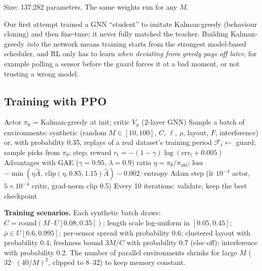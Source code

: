 Size: 137{,}282 parameters. The same weights run for any $M$.

\begin{whybox}
Our first attempt trained a GNN ``student'' to imitate Kalman-greedy (behaviour cloning) and then fine-tune; it never
fully matched the teacher. Building Kalman-greedy \emph{into} the network means training starts from the strongest
model-based scheduler, and RL only has to learn \emph{when deviating from greedy pays off later}, for example polling a
sensor before the guard forces it at a bad moment, or not trusting a wrong model.
\end{whybox}

\subsection{Training with PPO}

\begin{algorithm}[htbp]
\caption{PPO training of the GNN scheduler}
\begin{algorithmic}[1]
\State Actor $\pi_\theta$ = Kalman-greedy at init; critic $V_\phi$ (2-layer GNN)
  \State Sample a batch of environments: synthetic (random $M\in[10,100]$, $C$, $\ell$, $\rho$, layout, $F$, interference)
  \Statex\hspace{1.3em}or, with probability 0.35, replays of a real dataset's training period
    \State $\mathcal F_t\gets$ guard; sample picks from $\pi_\theta$; step; reward $r_t=-(1-\gamma)\log(\text{err}_t+0.005)$
  \EndFor
  \State Advantages with GAE ($\gamma=0.95$, $\lambda=0.9$)
    \State ratio $\eta=\pi_\theta/\pi_{\text{old}}$; loss $-\min(\eta\hat A,\ \mathrm{clip}(\eta,0.85,1.15)\hat A) - 0.002\cdot\text{entropy}$
    \State Adam step (lr $10^{-4}$ actor, $5\times10^{-4}$ critic, grad-norm clip 0.5)
  \EndFor
  \State Every 10 iterations: validate, keep the best checkpoint
\EndFor
\end{algorithmic}
\end{algorithm}

\textbf{Training scenarios.} Each synthetic batch draws: $C=\mathrm{round}(M\cdot U[0.08,0.35])$; length scale
log-uniform in $[0.05,0.45]$; $\bar\rho\in U[0.6,0.995]$; per-sensor spread with probability 0.6; clustered layout with
probability 0.4; freshness bound $3M/C$ with probability 0.7 (else off); interference with probability 0.2. The
number of parallel environments shrinks for large $M$ ($32\cdot(40/M)^2$, clipped to 8--32) to keep memory constant.

